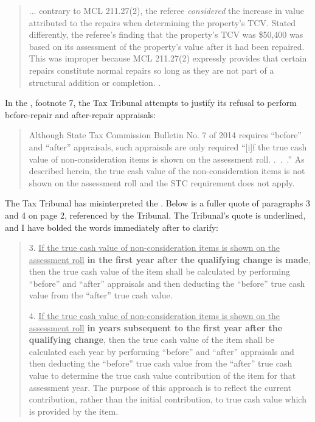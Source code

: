 \documentclass[12pt,\documentclassflag]{michiganCourtOfAppealsBrief}
\begin{document}
\begin{quote}
... contrary to MCL 211.27(2), the referee \textit{considered} the increase in value attributed to the repairs when determining the property's TCV. Stated differently, the referee's finding that the property's TCV was \$50,400 was based on its assessment of the property's value after it had been repaired. This was improper because MCL 211.27(2) expressly provides that certain repairs constitute normal repairs so long as they are not part of a structural addition or completion. .
\end{quote}

In the \reconsiderationDenied[3], footnote 7, the Tax Tribunal attempts to justify its refusal to perform before-repair and after-repair appraisals:

\begin{quote}
	Although State Tax Commission Bulletin No. 7 of 2014 requires ``before'' and ``after'' appraisals, such appraisals are only required ``[i]f the true cash value of non-consideration items is shown on the assessment roll. .~.~.'' As described herein, the true cash value of the non-consideration items is not shown on the assessment roll and the STC requirement does not apply.
\end{quote}

The Tax Tribunal has misinterpreted the \cite[s]{STC Bulletin}. Below is a fuller quote of paragraphs 3 and 4 on page 2, referenced by the Tribunal. The Tribunal's quote is underlined, and I have bolded the words immediately after to clarify:

\begin{quotation}
3. \underline{If the true cash value of non-consideration items is shown on the assessment roll} \textbf{in the first year after the qualifying change is made}, then the true cash value of the item shall be calculated by performing ``before'' and ``after'' appraisals and then deducting the ``before'' true cash value from the ``after'' true cash value.

4. \underline{If the true cash value of non-consideration items is shown on the assessment roll} \textbf{in years subsequent to the first year after the qualifying change}, then the true cash value of the item shall be calculated each year by performing ``before'' and ``after'' appraisals and then deducting the ``before'' true cash value from the ``after'' true cash value to determine the true cash value contribution of the item for that assessment year. The purpose of this approach is to reflect the current contribution, rather than the initial contribution, to true cash value which is provided by the item.
\end{quotation}
\end{document}
